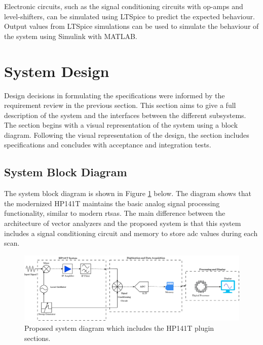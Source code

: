 \documentclass[class=report,11pt,crop=false]{standalone}
\begin{document}
	Electronic circuits, such as the signal conditioning circuits with op-amps and level-shifters, can be simulated using LTSpice to predict the expected behaviour. Output values from LTSpice simulations can be used to simulate the behaviour of the system using Simulink with MATLAB.
			
	\section{System Design}
	
	Design decisions in formulating the specifications were informed by the requirement review in the previous section. This section aims to give a full description of the system and the interfaces between the different subsystems. The section begins with a visual representation of the system using a block diagram. Following the visual representation of the design, the section includes specifications and concludes with acceptance and integration tests. 
	
	\subsection{System Block Diagram}
	
	The system block diagram is shown in Figure \ref{fig:system-block-diagram} below. The diagram shows that the modernized HP141T maintains the basic analog signal processing functionality, similar to modern \acrshort{rtsa}s. The main difference between the architecture of vector analyzers and the proposed system is that this system includes a signal conditioning circuit and memory to store \acrshort{adc} values during each scan.
	
	\begin{figure}[ht!]
	 	\centering
	 	\includegraphics[width=1.0\textwidth]{Figures/Methodology/system-block-diagram}
	 	\caption{Proposed system diagram which includes the HP141T plugin sections.}
	 	\label{fig:system-block-diagram}
	 \end{figure}
	
	\ifstandalone
	
	\printnoidxglossary[type=\acronymtype,nonumberlist]
	\fi
\end{document}
